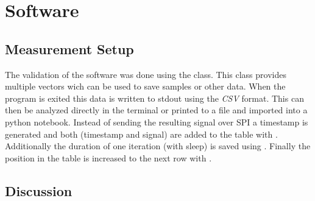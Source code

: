\section{Software}

\subsection{Measurement Setup}

The validation of the software was done using the  class. This class provides multiple vectors wich can be used to save samples or other data. When the program is exited this data is written to stdout using the \textit{CSV} format. This can then be analyzed directly in the terminal or printed to a file and imported into a python notebook.\p
%
Instead of sending the resulting signal over SPI a timestamp is generated and both (timestamp and signal) are added to the table with . Additionally the duration of one iteration (with sleep) is saved using . Finally the position in the table is increased to the next row with .

\subsection{Discussion}

